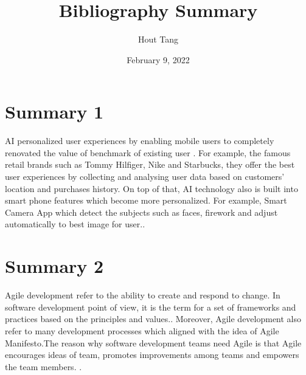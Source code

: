 \documentclass{article}
\title{Bibliography Summary}
\author{Hout Tang}
\date{February 9, 2022}
\begin{document}
\maketitle

\section*{Summary 1}
AI personalized user experiences by enabling mobile users to completely renovated the value of benchmark of existing user \cite{VTArticle}. For example, the famous retail brands such as Tommy Hilfiger, Nike and Starbucks, they offer the best user experiences by collecting and analysing user data based on customers' location and purchases history. On top of that, AI technology also is built into smart phone features which become more personalized. For example, Smart Camera App which detect the subjects such as faces, firework and adjust automatically to best image for user.\cite{VTArticle}.
 

\medskip

\section*{Summary 2}

Agile development refer to the ability to create and respond to change. In software development point of view, it is the term for a set of frameworks and practices based on the principles and values.\cite{AgileArticleg}. Moreover, Agile development also refer to many development processes which aligned with the idea of Agile Manifesto.The reason why software development teams need Agile is that Agile encourages ideas of team, promotes improvements among teams and empowers the team members. \cite{al2020agile}. 




\printbibliography
\end{document}
